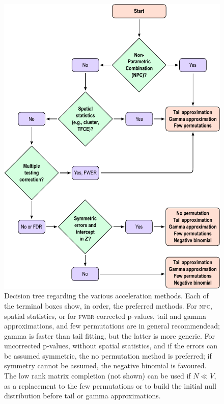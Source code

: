 \begin{figure}[!tp]
\begin{center}
\includegraphics{figures/recomm.pdf}
\end{center}
\caption[Decision tree regarding the various acceleration methods.]{Decision tree regarding the various acceleration methods. Each of the terminal boxes show, in order, the preferred methods. For \textsc{npc}, spatial statistics, or for \textsc{fwer}-corrected p-values, tail and gamma approximations, and few permutations are in general recommendead; gamma is faster than tail fitting, but the latter is more generic. For uncorrected p-values, without spatial statistics, and if the errors can be assumed symmetric, the no permutation method is preferred; if symmetry cannot be assumed, the negative binomial is favoured. The low rank matrix completion (not shown) can be used if $N \ll V$, as a replacement to the few permutations or to build the initial null distribution before tail or gamma approximations.}
\label{fig:recomm}
\end{figure}
